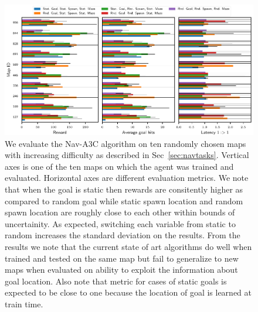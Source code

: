 %
\begin{figure}%
  \includegraphics[width=\linewidth]{images/plot_summary_bar_plots.pdf}%
  \vspace{-1em}%
  \caption{
    We evaluate the Nav-A3C\cite{MiPaViICLR2017} algorithm on ten randomly chosen maps with increasing difficulty as described in Sec~\ref{sec:navtasks}.
  Vertical axes is one of the ten maps on which the agent was trained and evaluated.
  Horizontal axes are different evaluation metrics.
  We note that when the goal is static then rewards are consitently higher as compared to random goal while static spawn location and random spawn location are roughly close to each other within bounds of uncertainity. As expected, switching each variable from static to random increases the standard deviation on the results.
  From the \LatencyOneGtOne{} results we note that the current state of art algorithms do well when trained and tested on the same map but fail to generalize to new maps when evaluated on ability to exploit the information about goal location.
  Also note that \LatencyOneGtOne{} metric for cases of static goals is expected to be close to one because the location of goal is learned at train time.
  }%
\label{fig:latency-goal-reward}%
\end{figure}


